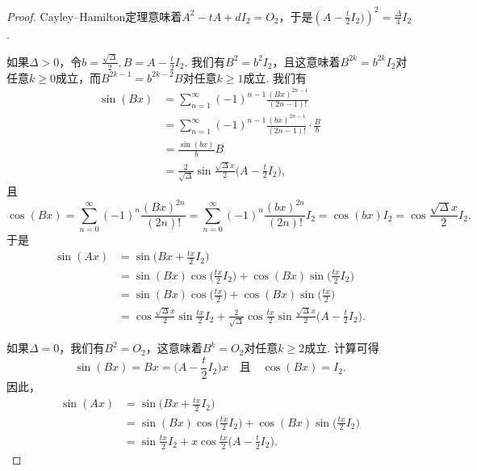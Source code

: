 \begin{proof}
  Cayley--Hamilton定理意味着$A^2-tA+dI_2=O_2$，于是$\left(A-\frac t2I_2)\right)^2=\frac{\varDelta}4I_2$.

  如果$\varDelta>0$，令$b=\frac{\sqrt{\varDelta}}2,B=A-\frac t2I_2$. 我们有$B^2=b^2I_2$，且这意味着$B^{2k}=b^{2k}I_2$对任意$k\ge0$成立，而$B^{2k-1}=b^{2k-2}B$对任意$k\ge1$成立. 我们有
  \begin{align*}
    \sin (Bx) & = \sum_{n=1}^\infty (-1)^{n-1} \frac{(Bx)^{2n-1}}{(2n-1)!} \\
    & = \sum_{n=1}^\infty (-1)^{n-1}\frac{(bx)^{2n-1}}{(2n-1)!} \cdot \frac Bb \\
    & = \frac{\sin(bx)}bB \\
    & = \frac2{\sqrt\varDelta}\sin\frac{\sqrt\varDelta x}2\Big( A - \frac t2I_2 \Big),
  \end{align*}
  且
  \[
    \cos(Bx) = \sum_{n=0}^\infty (-1)^n\frac{(Bx)^{2n}}{(2n)!} = \sum_{n=0}^\infty (-1)^n \frac{(bx)^{2n}}{(2n)!}I_2 = \cos(bx)I_2 = \cos \frac{\sqrt\varDelta x}2I_2.
  \]
  于是
  \begin{align*}
    \sin(Ax) & = \sin \Big( Bx + \frac{tx}2 I_2 \Big) \\
    & = \sin(Bx) \cos \Big( \frac{tx}2I_2\Big) + \cos(Bx) \sin \Big( \frac{tx}2I_2\Big) \\
    & = \sin (Bx) \cos \Big( \frac{tx}2\Big) + \cos(Bx) \sin \Big( \frac{tx}2\Big) \\
    & = \cos \frac{\sqrt\varDelta x}2\sin\frac{tx}2I_2 + \frac2{\sqrt\varDelta}\cos \frac{tx}2\sin \frac{\sqrt\varDelta x}2 \Big( A - \frac t2I_2 \Big).
  \end{align*}

  如果$\varDelta=0$，我们有$B^2=O_2$，这意味着$B^k=O_2$对任意$k\ge2$成立. 计算可得
  \[
    \sin (Bx) = Bx = \Big( A - \frac t2I_2 \Big)x\quad \text{且} \quad
    \cos(Bx) = I_2.
  \]
  因此，
  \begin{align*}
    \sin(Ax) & = \sin \Big( Bx + \frac{tx}2I_2 \Big) \\
    & = \sin(Bx)\cos\Big( \frac{tx}2I_2 \Big) + \cos(Bx) \sin \Big( \frac{tx}2I_2 \Big) \\
    & = \sin \frac{tx}2I_2 + x\cos \frac{tx}2 \Big( A - \frac t2I_2 \Big).
  \end{align*}


\end{proof}

